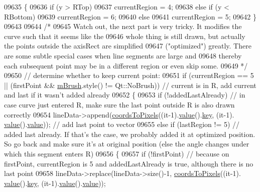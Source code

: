 \begin{DoxyCode}
09635     \{
09636       \textcolor{keywordflow}{if} (y > RTop)
09637         currentRegion = 4;
09638       \textcolor{keywordflow}{else} \textcolor{keywordflow}{if} (y < RBottom)
09639         currentRegion = 6;
09640       \textcolor{keywordflow}{else}
09641         currentRegion = 5;
09642     \}
09643     
09644     \textcolor{comment}{/*}
09645 \textcolor{comment}{      Watch out, the next part is very tricky. It modifies the curve such that it seems like the}
09646 \textcolor{comment}{      whole thing is still drawn, but actually the points outside the axisRect are simplified}
09647 \textcolor{comment}{      ("optimized") greatly. There are some subtle special cases when line segments are large and}
09648 \textcolor{comment}{      thereby each subsequent point may be in a different region or even skip some.}
09649 \textcolor{comment}{    */}
09650     \textcolor{comment}{// determine whether to keep current point:}
09651     \textcolor{keywordflow}{if} (currentRegion == 5 || (firstPoint && \hyperlink{a00024_a33f00674c0161c13315ab9da0895418e}{mBrush}.style() != Qt::NoBrush)) \textcolor{comment}{// current is in R, add
       current and last if it wasn't added already}
09652     \{
09653       \textcolor{keywordflow}{if} (!addedLastAlready) \textcolor{comment}{// in case curve just entered R, make sure the last point outside R is also
       drawn correctly}
09654         lineData->append(\hyperlink{a00024_ade710a776104b14c1c835168ce1bfc5c}{coordsToPixels}((it-1).\hyperlink{a00116_aee90379adb0307effb138f4871edbc5c}{value}().\hyperlink{a00116_a94bb892c30911cd62cba0707a5395be4}{key}, (it-1).
      \hyperlink{a00116_aee90379adb0307effb138f4871edbc5c}{value}().\hyperlink{a00116_aee90379adb0307effb138f4871edbc5c}{value})); \textcolor{comment}{// add last point to vector}
09655       \textcolor{keywordflow}{else} \textcolor{keywordflow}{if} (lastRegion != 5) \textcolor{comment}{// added last already. If that's the case, we probably added it at
       optimized position. So go back and make sure it's at original position (else the angle changes under which this
       segment enters R)}
09656       \{
09657         \textcolor{keywordflow}{if} (!firstPoint) \textcolor{comment}{// because on firstPoint, currentRegion is 5 and addedLastAlready is true,
       although there is no last point}
09658           lineData->replace(lineData->size()-1, \hyperlink{a00024_ade710a776104b14c1c835168ce1bfc5c}{coordsToPixels}((it-1).
      \hyperlink{a00116_aee90379adb0307effb138f4871edbc5c}{value}().\hyperlink{a00116_a94bb892c30911cd62cba0707a5395be4}{key}, (it-1).\hyperlink{a00116_aee90379adb0307effb138f4871edbc5c}{value}().\hyperlink{a00116_aee90379adb0307effb138f4871edbc5c}{value}));

\end{DoxyCode}
